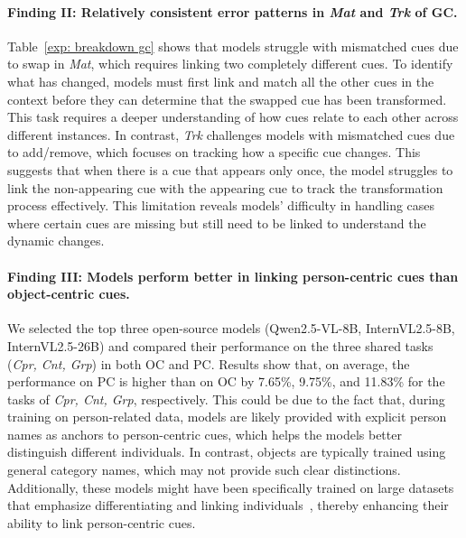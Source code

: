 \paragraph{Finding II: Relatively consistent error patterns in \textit{Mat} and \textit{Trk} of GC.} Table~\ref{exp: breakdown gc} shows that models struggle with mismatched cues due to swap in \textit{Mat}, which requires linking two completely different cues. To identify what has changed, models must first link and match all the other cues in the context before they can determine that the swapped cue has been transformed. 
This task requires a deeper understanding of how cues relate to each other across different instances. In contrast, \textit{Trk} challenges models with mismatched cues due to add/remove, which focuses on tracking how a specific cue changes. This suggests that when there is a cue that appears only once, the model struggles to link the non-appearing cue with the appearing cue to track the transformation process effectively. This limitation reveals models' difficulty in handling cases where certain cues are missing but still need to be linked to understand the dynamic changes. 

\paragraph{Finding III: Models perform better in linking person-centric cues than object-centric cues.} We selected the top three open-source models (Qwen2.5-VL-8B, InternVL2.5-8B, InternVL2.5-26B) and compared their performance on the three shared tasks (\textit{Cpr, Cnt, Grp}) in both OC and PC. Results show that, on average, the performance on PC is higher than on OC by 7.65\%, 9.75\%, and 11.83\% for the tasks of \textit{Cpr, Cnt, Grp}, respectively. This could be due to the fact that, during training on person-related data, models are likely provided with explicit person names as anchors to person-centric cues, which helps the models better distinguish different individuals. In contrast, objects are typically trained using general category names, which may not provide such clear distinctions. Additionally, these models might have been specifically trained on large datasets that emphasize differentiating and linking individuals~\citep{pi2024personalized,human-data}, thereby enhancing their ability to link person-centric cues.
